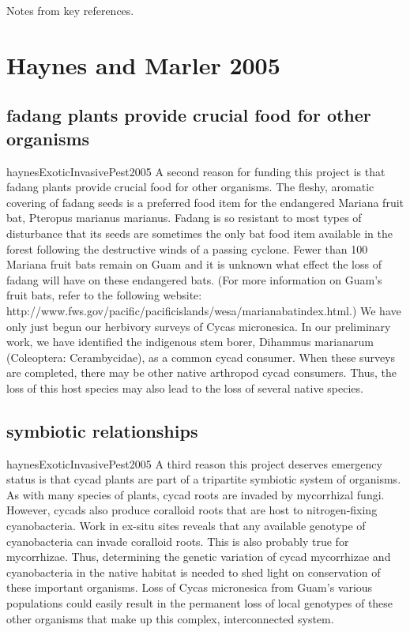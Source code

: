 \documentclass[12pt,letterpaper,english,bibliography=totocnumbered, abstract=on]{scrartcl}
\begin{document}
\begin{appendices}
	
	Notes from key references.

\section{Haynes and Marler 2005}

\subsection{fadang plants provide crucial food for other organisms}
\begin{displaycquote}{haynesExoticInvasivePest2005}
A second reason for funding this project is that fadang plants provide crucial food for other organisms.
The fleshy, aromatic covering of fadang seeds is a preferred food item for the endangered Mariana
fruit bat, Pteropus marianus marianus. Fadang is so resistant to most types of disturbance that its
seeds are sometimes the only bat food item available in the forest following the destructive winds of a
passing cyclone. Fewer than 100 Mariana fruit bats remain on Guam and it is unknown what effect the
loss of fadang will have on these endangered bats. (For more information on Guam’s fruit bats, refer
to the following website: http://www.fws.gov/pacific/pacificislands/wesa/marianabatindex.html.)
We have only just begun our herbivory surveys of Cycas micronesica. In our preliminary work, we
have identified the indigenous stem borer, Dihammus marianarum (Coleoptera: Cerambycidae), as a
common cycad consumer. When these surveys are completed, there may be other native arthropod
cycad consumers. Thus, the loss of this host species may also lead to the loss of several native species.
\end{displaycquote}

\subsection{symbiotic relationships}
\begin{displaycquote}{haynesExoticInvasivePest2005}
A third reason this project deserves emergency status is that cycad plants are part of a tripartite
symbiotic system of organisms. As with many species of plants, cycad roots are invaded by
mycorrhizal fungi. However, cycads also produce coralloid roots that are host to nitrogen-fixing
cyanobacteria. Work in ex-situ sites reveals that any available genotype of cyanobacteria can invade
coralloid roots. This is also probably true for mycorrhizae. Thus, determining the genetic variation of
cycad mycorrhizae and cyanobacteria in the native habitat is needed to shed light on conservation of
these important organisms. Loss of Cycas micronesica from Guam’s various populations could easily
result in the permanent loss of local genotypes of these other organisms that make up this complex,
interconnected system.
\end{displaycquote}


\end{appendices}
\end{document}
